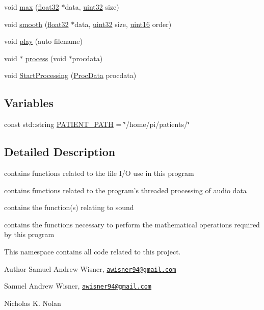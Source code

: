 \begin{DoxyCompactItemize}
\item 
void \hyperlink{namespacevaso_a649803d9dd74002f7975dba6b48b56ce}{max} (\hyperlink{definitions_8hpp_aacdc525d6f7bddb3ae95d5c311bd06a1}{float32} $\ast$data, \hyperlink{definitions_8hpp_a1134b580f8da4de94ca6b1de4d37975e}{uint32} size)
\item 
void \hyperlink{namespacevaso_a5b7fc1a58199e2cac989f417a9faa1ce}{smooth} (\hyperlink{definitions_8hpp_aacdc525d6f7bddb3ae95d5c311bd06a1}{float32} $\ast$data, \hyperlink{definitions_8hpp_a1134b580f8da4de94ca6b1de4d37975e}{uint32} size, \hyperlink{definitions_8hpp_a05f6b0ae8f6a6e135b0e290c25fe0e4e}{uint16} order)
\item 
void \hyperlink{namespacevaso_a7da499b9b1b5a492bea8ab8681e57c22}{play} (auto filename)
\item 
void $\ast$ \hyperlink{namespacevaso_a0579351ab19fb51460f6e9c50f234e22}{process} (void $\ast$procdata)
\item 
void \hyperlink{namespacevaso_aec526a2735f71ef68cea3e00ae943edf}{Start\+Processing} (\hyperlink{structProcData}{Proc\+Data} procdata)
\end{DoxyCompactItemize}
\subsection*{Variables}
\begin{DoxyCompactItemize}
\item 
const std\+::string \hyperlink{namespacevaso_a0f49c8240a13e7d853912ad78d5f53c9}{P\+A\+T\+I\+E\+N\+T\+\_\+\+P\+A\+T\+H} = \char`\"{}/home/pi/patients/\char`\"{}
\end{DoxyCompactItemize}


\subsection{Detailed Description}
contains functions related to the file I/\+O use in this program 

contains functions related to the program's threaded processing of audio data

contains the function(s) relating to sound

contains the functions necessary to perform the mathematical operations required by this program

This namespace contains all code related to this project.

\begin{DoxyAuthor}{Author}
Samuel Andrew Wisner, \href{mailto:awisner94@gmail.com}{\tt awisner94@gmail.\+com}

Samuel Andrew Wisner, \href{mailto:awisner94@gmail.com}{\tt awisner94@gmail.\+com} 

Nicholas K. Nolan 
\end{DoxyAuthor}



